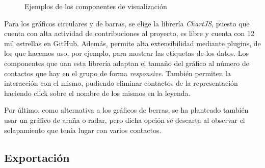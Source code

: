 \begin{figure}[h]
	
	\qquad
	\caption{Ejemplos de los componentes de visualización}
	\label{fig:chap4:visualization_examples}
\end{figure}

Para los gráficos circulares y de barras, se elige la librería \textit{ChartJS}, puesto que cuenta con alta actividad de contribuciones al proyecto, es libre y cuenta con 12 mil estrellas en GitHub. Además, permite alta extensibilidad mediante plugins, de los que hacemos uso, por ejemplo, para mostrar las etiquetas de los datos. Los componentes que uan esta librería adaptan el tamaño del gráfico al número de contactos que hay en el grupo de forma \textit{responsive}. También permiten la interacción con el mismo, pudiendo eliminar contactos de la representación haciendo click sobre el nombre de los mismos en la leyenda.

Por último, como alternativa a los gráficos de berras, se ha planteado también usar un gráfico de araña o radar, pero dicha opción se descarta al observar el solapamiento que tenía lugar con varios contactos.


\subsection{Exportación}

